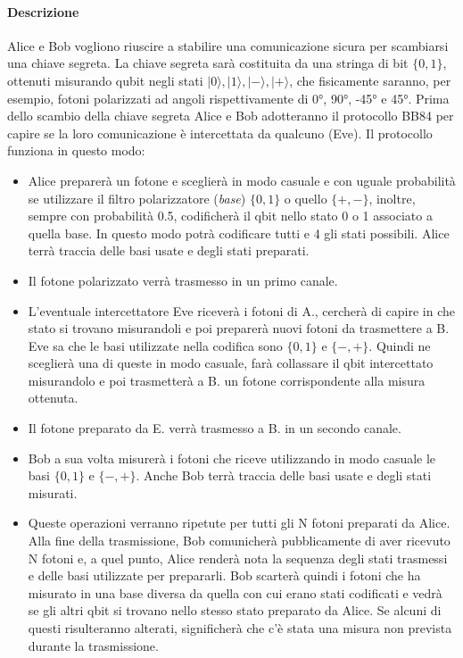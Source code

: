 \documentclass[11 pt, a4paper]{article}
\begin{document}
\paragraph{Descrizione}
Alice e Bob vogliono riuscire a stabilire una comunicazione sicura per scambiarsi una chiave segreta. La chiave segreta sarà costituita da una stringa di bit $\{0,1\}$, ottenuti misurando qubit negli stati $|0\rangle, |1\rangle, |-\rangle, |+\rangle$, che fisicamente saranno, per esempio, fotoni polarizzati ad angoli rispettivamente di 0°, 90°, -45° e 45°.
Prima dello scambio della chiave segreta Alice e Bob adotteranno il protocollo BB84 per capire se la loro comunicazione è intercettata da qualcuno (Eve). Il protocollo funziona in questo modo:
\begin{itemize}
    \item Alice preparerà un fotone e sceglierà in modo casuale e con uguale probabilità se utilizzare il filtro polarizzatore (\textit{base}) $\{0,1\}$ o quello $\{+,-\}$, inoltre, sempre con probabilità 0.5, codificherà il qbit nello stato 0 o 1 associato a quella base. In questo modo potrà codificare tutti e 4 gli stati possibili. Alice terrà traccia delle basi usate e degli stati preparati.
    \item Il fotone polarizzato verrà trasmesso in un primo canale.
    \item L'eventuale intercettatore Eve riceverà i fotoni di A., cercherà di capire in che stato si trovano misurandoli e poi preparerà nuovi fotoni da trasmettere a B. 
    Eve sa che le basi utilizzate nella codifica sono $\{0,1\}$ e $\{-,+\}$. Quindi ne sceglierà una di queste in modo casuale, farà collassare il qbit intercettato misurandolo e poi trasmetterà a B. un fotone corrispondente alla misura ottenuta.
    \item Il fotone preparato da E. verrà trasmesso a B. in un secondo canale.
    \item Bob a sua volta misurerà i fotoni che riceve utilizzando in modo casuale le basi $\{0,1\}$ e $\{-,+\}$. Anche Bob terrà traccia delle basi usate e degli stati misurati.
    \item Queste operazioni verranno ripetute per tutti gli N fotoni preparati da Alice. Alla fine della trasmissione, Bob comunicherà pubblicamente di aver ricevuto N fotoni e, a quel punto, Alice renderà nota la sequenza degli stati trasmessi e delle basi utilizzate per prepararli. Bob scarterà quindi i fotoni che ha misurato in una base diversa da quella con cui erano stati codificati e vedrà se gli altri qbit si trovano nello stesso stato preparato da Alice. Se alcuni di questi risulteranno alterati, significherà che c'è stata una misura non prevista durante la trasmissione.
\end{itemize}
\end{document}

